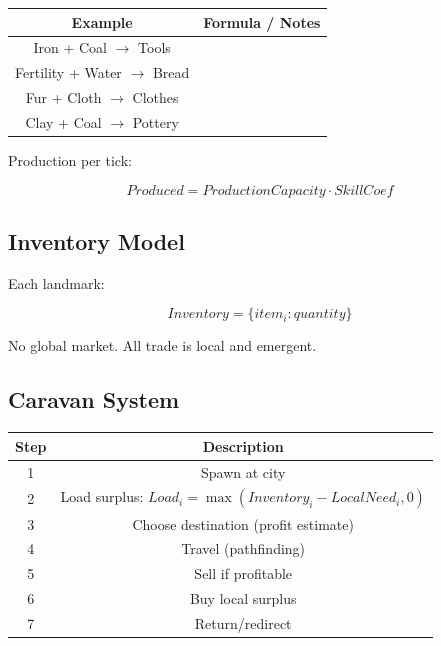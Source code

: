 \begin{table}[H]
\centering
\begin{tabular}{|c|c|}
\hline
Example & Formula / Notes \\
\hline
Iron + Coal $\rightarrow$ Tools &  \\
Fertility + Water $\rightarrow$ Bread &  \\
Fur + Cloth $\rightarrow$ Clothes &  \\
Clay + Coal $\rightarrow$ Pottery &  \\
\hline
\end{tabular}
\end{table}

Production per tick:

\begin{equation}
Produced = ProductionCapacity \cdot SkillCoef
\end{equation}



\subsection{Inventory Model}

Each landmark:

\begin{equation}
Inventory = \{ item_i : quantity \}
\end{equation}

No global market. All trade is local and emergent.



\subsection{Caravan System}

\begin{table}[H]
\centering
\begin{tabular}{|c|c|}
\hline
Step & Description \\
\hline
1 & Spawn at city \\
2 & Load surplus: $Load_i = \max(Inventory_i - LocalNeed_i, 0)$ \\
3 & Choose destination (profit estimate) \\
4 & Travel (pathfinding) \\
5 & Sell if profitable \\
6 & Buy local surplus \\
7 & Return/redirect \\
\hline
\end{tabular}
\end{table}

